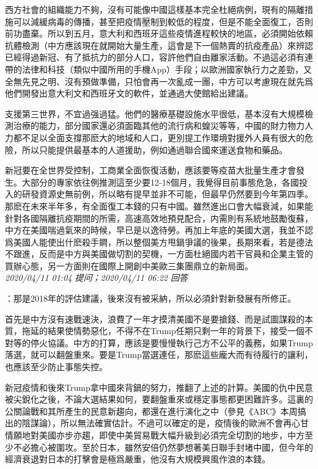 \documentclass[twocolumn]{ctexart}
\begin{document}
西方社會的組織能力不夠，沒有可能像中國這樣基本完全杜絕病例，現有的隔離措施可以減緩病毒的傳播，甚至把疫情壓制到較低的程度，但是不能全面復工，否則前功盡棄。所以到五月，意大利和西班牙這些疫情進程較快的地區，必須開始依賴抗體檢測（中方應該現在就開始大量生產，這會是下一個熱賣的抗疫產品）來辨認已經得過新冠、有了抵抗力的部分人口，容許他們自由離家活動。不過這必須有連帶的法律和科技（類似中國所用的手機App）手段；以歐洲國家執行力之差勁，又全無先見之明、沒有預做準備，只怕會再一次亂成一團，中方可以考慮現在就先爲他們開發出意大利文和西班牙文的軟件，並通過大使館給出建議。

支援第三世界，不宜過强過猛。他們的醫療基礎設施水平很低，基本沒有大規模檢測治療的能力，部分國家還必須面臨其他的流行病和蝗災等等，中國的財力物力人力都不足以全面支撐那麽大的地域和人口，更別提工作環境對援外人員有很大的危險，所以只能提供最基本的人道援助，例如通過聯合國來運送食物和藥品。

新冠要在全世界受控制，工商業全面恢復活動，應該要等疫苗大批量生產才會發生。大部分的專家依往例推測這至少要12-18個月，我覺得目前事態危急，各國投入的研發資源史無前例，所以略有提早並非不可能，但最早仍然要到今年第四季。那麽在未來半年多，有全面復工本錢的只有中國。雖然進出口會大幅衰減，如果能針對各國隔離抗疫期間的所需，高速高效地預見配合，内需則有系統地鼓勵復蘇，中方在美國喘過氣來的時候，早已是以逸待勞。再加上年底的美國大選，我並不認爲美國人能使出什麽殺手鐧，所以整個美方甩鍋爭議的後果，長期來看，若是德法不跟進，反而是中方與美國做切割的契機，一方面杜絕國内若干官員和企業主管的買辦心態，另一方面則在國際上開創中美歐三集團鼎立的新局面。
\\

\textit{\hfill\noindent\small 2020/04/11 01:04 提问；2020/04/11 06:22 回答}

：那是2018年的評估建議，後來沒有被采納，所以必須針對新發展有所修正。

首先是中方沒有速戰速決，浪費了一年才摸清美國不是要搶錢、而是試圖謀殺的本質，拖延的結果使情勢惡化，不得不在Trump任期只剩一年的背景下，接受一個不對等的停火協議。中方的打算，應該是要慢慢執行己方不公平的義務，如果Trump落選，就可以翻盤重來。要是Trump當選連任，那麽這些龐大而有待履行的讓利，也應該至少防止事態失控。

新冠疫情和後來Trump拿中國來背鍋的努力，推翻了上述的計算。美國的仇中民意被尖銳化之後，不論大選結果如何，要翻盤重來或穩定事態都更困難許多。這裏的公關論戰和其所產生的民意新趨向，都還在進行演化之中（參見《ABC》本周搞出的陰謀論），所以無法確實估計。不過可以確定的是，疫情後的歐洲不會再心甘情願地對美國亦步亦趨，即使中美貿易戰大幅升級到必須完全切割的地步，中方至少不必擔心被圍攻。至於日本，雖然安倍仍然夢想著美日聯手封堵中國，但今年的經濟衰退對日本的打擊會是極爲嚴重，他沒有大規模興風作浪的本錢。
\\
\end{document}
